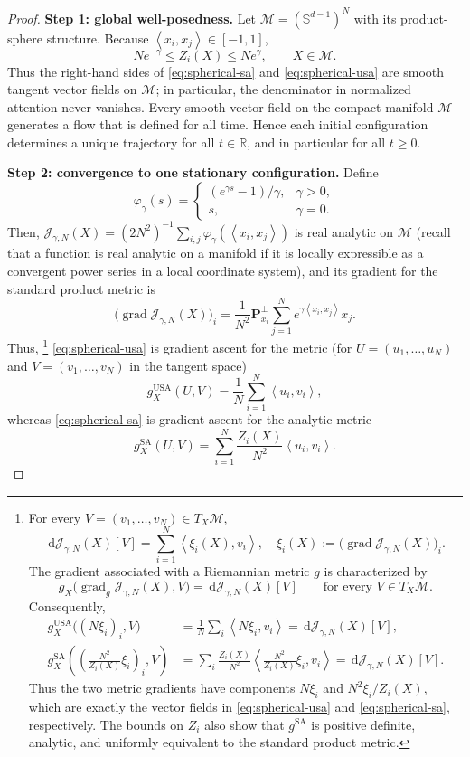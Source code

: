 \documentclass[11pt]{amsart}
\numberwithin{equation}{section}
\theoremstyle{plain}
\newcommand{\R}{\mathbb{R}}
\newcommand{\dd}{\,\mathrm{d}}
\newcommand{\ip}[2]{\left\langle#1,#2\right\rangle}
\begin{document}
\begin{proof}
\textbf{Step 1: global well-posedness.}\quad
Let $\mathcal M=(\mathbb S^{d-1})^N$ with its product-sphere structure.
Because $\ip{x_i}{x_j}\in[-1,1]$,
\[
 Ne^{-\gamma}\leq Z_i(X)\leq Ne^\gamma,
 \qquad X\in\mathcal M.
\]
Thus the right-hand sides of \eqref{eq:spherical-sa} and
\eqref{eq:spherical-usa} are smooth tangent vector fields on $\mathcal M$;
in particular, the denominator in normalized attention never vanishes.
Every smooth vector field on the compact manifold $\mathcal M$ generates a flow that is defined for all time. 
Hence each initial configuration determines a unique trajectory for all
$t\in\R$, and in particular for all $t\geq0$.

\par\medskip\noindent
\textbf{Step 2: convergence to one stationary configuration.}\quad
Define
\[
 \varphi_\gamma(s)=
 \begin{cases}
  (e^{\gamma s}-1)/\gamma,&\gamma>0,\\
  s,&\gamma=0.
 \end{cases}
\]
Then, $\mathcal J_{\gamma,N}(X)=(2N^2)^{-1}\sum_{i,j}
\varphi_\gamma(\ip{x_i}{x_j})$ is real analytic on $\mathcal M$ (recall that a function is real analytic on a manifold if it is locally expressible as a convergent power series in a local coordinate system), and its
gradient for the standard product metric is
\[
 \bigl(\operatorname{grad}\mathcal J_{\gamma,N}(X)\bigr)_i
 =\frac1{N^2}\mathbf P_{x_i}^{\perp}
   \sum_{j=1}^N e^{\gamma\ip{x_i}{x_j}}x_j.
\]
Thus, 
\footnote{ 
  For every $V=(v_1,\ldots,v_N)\in T_X\mathcal M$, \[
 \dd\mathcal J_{\gamma,N}(X)[V]
 =\sum_{i=1}^N\ip{\xi_i(X)}{v_i}, \quad \xi_i(X):=\bigl(\operatorname{grad}\mathcal J_{\gamma,N}(X)\bigr)_i.
\]
The gradient associated with a Riemannian metric $g$ is characterized by
\[
 g_X\bigl(\operatorname{grad}_g\mathcal J_{\gamma,N}(X),V\bigr)
 =\dd\mathcal J_{\gamma,N}(X)[V]
 \qquad\text{for every }V\in T_X\mathcal M.
\]
Consequently,
\begin{align*}
 g_X^{\mathrm{USA}}\bigl((N\xi_i)_i,V\bigr)
 &=\frac1N\sum_i\ip{N\xi_i}{v_i}
 =\dd\mathcal J_{\gamma,N}(X)[V],\\
 g_X^{\mathrm{SA}}
 \left(\left(\frac{N^2}{Z_i(X)}\xi_i\right)_i,V\right)
 &=\sum_i\frac{Z_i(X)}{N^2}
   \ip{\frac{N^2}{Z_i(X)}\xi_i}{v_i}
 =\dd\mathcal J_{\gamma,N}(X)[V].
\end{align*}
Thus the two metric gradients have components $N\xi_i$ and
$N^2\xi_i/Z_i(X)$, which are exactly the vector fields in
\eqref{eq:spherical-usa} and \eqref{eq:spherical-sa}, respectively.  The
bounds on $Z_i$ also show that $g^{\mathrm{SA}}$ is positive definite,
analytic, and uniformly equivalent to the standard product metric.}
\eqref{eq:spherical-usa} is gradient ascent for the metric (for $U=(u_1,\ldots,u_N)$ and $V=(v_1,\ldots,v_N)$ in the tangent space)
\[
 g_X^{\mathrm{USA}}(U,V)=\frac1N\sum_{i=1}^N\ip{u_i}{v_i},
\]
whereas \eqref{eq:spherical-sa} is gradient ascent for the analytic metric
\[
 g_X^{\mathrm{SA}}(U,V)
 =\sum_{i=1}^N\frac{Z_i(X)}{N^2}\ip{u_i}{v_i}.
\]
 


\end{proof}
\end{document}
